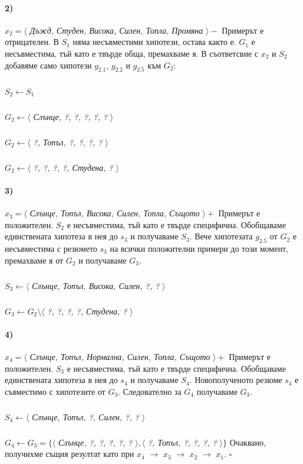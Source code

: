 \documentclass[12pt]{article}
\begin{document}
	\paragraph{2)} $x_{2} = \langle $ \textit{Дъжд, Студен, Висока, Силен, Топла, Промяна} $\rangle  -$ \newline\newline
	Примерът е отрицателен. В $S_{1}$ няма несъвместими хипотези, остава както е. $G_{1}$ е несъвместима, тъй като е твърде обща, премахваме я. В съответсвие с $x_{2}$ и $S_{2}$ добавяме само хипотези $g_{2.1}$, $g_{2.2}$ и $g_{2.5}$ към $G_{2}$:
		\subparagraph{}
		$S_{2} \leftarrow S_{1}$
		\subparagraph{} 
		$G_{2} \leftarrow \langle $ \textit{Слънце, ?, ?, ?, ?, ?} $ \rangle$
		\subparagraph{} 
		$G_{2} \leftarrow \langle $ \textit{?, Топъл, ?, ?, ?, ?} $ \rangle$
		\subparagraph{} 
		$G_{2} \leftarrow \langle $ \textit{?, ?, ?, ?, Студена, ?} $ \rangle$
	
	\paragraph{3)} $x_{3} = \langle $ \textit{Слънце, Топъл, Висока, Силен, Топла, Същото} $\rangle  +$ \newline\newline
	Примерът е положителен. $S_{2}$ е несъвместима, тъй като е твърде специфична. Обобщаваме единствената хипотеза в нея до $s_{3}$ и получаваме $S_{3}$. Вече хипотезата $g_{2.5}$ от $G_{2}$ е несъвместима с резюмето $s_{3}$ на всички положителни примери до този момент, премахваме я от $G_{2}$ и получаваме $G_{3}$.
		\subparagraph{}
		$S_{3} \leftarrow \langle $ \textit{Слънце, Топъл, Висока, Силен, ?, ?} $ \rangle $
		\subparagraph{} 
		$G_{3} \leftarrow G_{2} \setminus \langle $ \textit{?, ?, ?, ?, Студена, ?} $ \rangle$
		
	\paragraph{4)} $x_{4} = \langle $ \textit{Слънце, Топъл, Нормална, Силен, Топла, Същото} $\rangle  +$ \newline\newline
	Примерът е положителен. $S_{3}$ е несъвместима, тъй като е твърде специфична. Обобщаваме единствената хипотеза в нея до $s_{4}$ и получаваме $S_{4}$. Новополученото резюме $s_{4}$ е съвместимо с хипотезите от $G_{3}$. Следователно за $G_{4}$ получаваме $G_{3}$.
		\subparagraph{}
		$S_{4} \leftarrow \langle $ \textit{Слънце, Топъл, ?, Силен, ?, ?} $ \rangle $
		\subparagraph{} 
		$G_{4} \leftarrow G_{3} = \{ \langle $ \textit{Слънце, ?, ?, ?, ?, ?} $ \rangle, \langle $ \textit{?, Топъл, ?, ?, ?, ?} $ \rangle \}$
	\newline
	Очаквано, получихме същия резултат като при $x_{4}$ $\rightarrow$ $x_{3}$ $\rightarrow$ $x_{2}$ $\rightarrow$ $x_{1}$. $\square$
	
\end{document}
